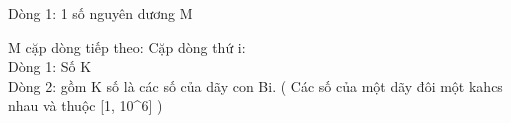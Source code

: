 Dòng 1: 1 số nguyên dương M

M cặp dòng tiếp theo: Cặp dòng thứ i:
\\Dòng 1: Số K
\\Dòng 2: gồm K số là các số của dãy con Bi. ( Các số của một dãy đôi một kahcs nhau và thuộc [1, 10^6] )